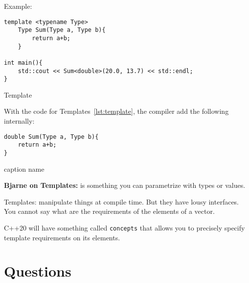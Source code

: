 \documentclass[11pt, a4paper]{article}
\begin{document}
Example:

\begin{listing}[hbt!]
\begin{verbatim}
template <typename Type>
	Type Sum(Type a, Type b){
		return a+b;
	}

int main(){
	std::cout << Sum<double>(20.0, 13.7) << std::endl;
}
\end{verbatim}
\caption{Template}
\label{lst:template}
\end{listing}



With the code for Templates~\ref{lst:template}, the compiler add the following internally:

\begin{listing}[hbt!]
\begin{verbatim}
double Sum(Type a, Type b){
	return a+b;
}
\end{verbatim}
\caption{caption name}
\label{lst:caption_name}
\end{listing}




\textbf{Bjarne on Templates:} is something you can parametrize with types or values. 

Templates: manipulate things at compile time. But they have lousy interfaces. You cannot say what are the requirements of the elements of a vector.

C++20 will have something called \texttt{concepts} that allows you to precisely specify template requirements on its elements.




































\section{Questions}%
\label{sec:questions}
\end{document}
